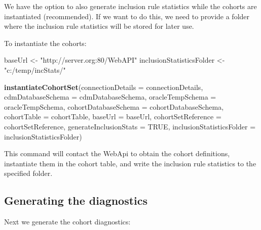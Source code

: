 \documentclass[
]{article}
\newenvironment{Shaded}{\begin{snugshade}}{\end{snugshade}}
\newcommand{\DataTypeTok}[1]{\textcolor[rgb]{0.13,0.29,0.53}{#1}}
\newcommand{\KeywordTok}[1]{\textcolor[rgb]{0.13,0.29,0.53}{\textbf{#1}}}
\newcommand{\NormalTok}[1]{#1}
\newcommand{\OtherTok}[1]{\textcolor[rgb]{0.56,0.35,0.01}{#1}}
\newcommand{\StringTok}[1]{\textcolor[rgb]{0.31,0.60,0.02}{#1}}
\begin{document}
We have the option to also generate inclusion rule statistics while the
cohorts are instantiated (recommended). If we want to do this, we need
to provide a folder where the inclusion rule statistics will be stored
for later use.

To instantiate the cohorts:

\begin{Shaded}
\begin{Highlighting}[]
\NormalTok{baseUrl <-}\StringTok{ "http://server.org:80/WebAPI"}
\NormalTok{inclusionStatisticsFolder <-}\StringTok{ "c:/temp/incStats/"}

\KeywordTok{instantiateCohortSet}\NormalTok{(}\DataTypeTok{connectionDetails =}\NormalTok{ connectionDetails,}
                     \DataTypeTok{cdmDatabaseSchema =}\NormalTok{ cdmDatabaseSchema,}
                     \DataTypeTok{oracleTempSchema =}\NormalTok{ oracleTempSchema,}
                     \DataTypeTok{cohortDatabaseSchema =}\NormalTok{ cohortDatabaseSchema,}
                     \DataTypeTok{cohortTable =}\NormalTok{ cohortTable,}
                     \DataTypeTok{baseUrl =}\NormalTok{ baseUrl,}
                     \DataTypeTok{cohortSetReference =}\NormalTok{ cohortSetReference,}
                     \DataTypeTok{generateInclusionStats =} \OtherTok{TRUE}\NormalTok{,}
                     \DataTypeTok{inclusionStatisticsFolder =}\NormalTok{ inclusionStatisticsFolder)}
\end{Highlighting}
\end{Shaded}

This command will contact the WebApi to obtain the cohort definitions,
instantiate them in the cohort table, and write the inclusion rule
statistics to the specified folder.

\hypertarget{generating-the-diagnostics}{%
\subsection{Generating the
diagnostics}\label{generating-the-diagnostics}}

Next we generate the cohort diagnostics:
\end{document}
